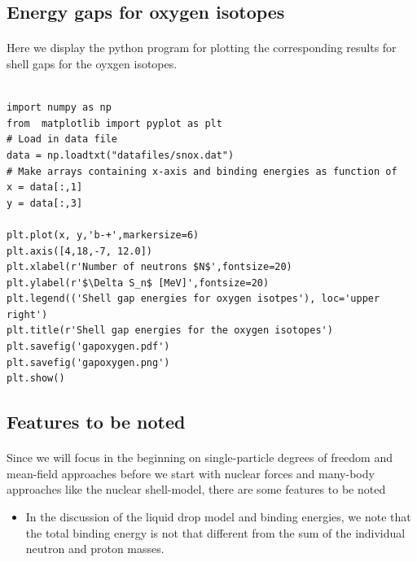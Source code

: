 \documentclass[%
twoside,                 %
final,                   %
10pt]{article}
\begin{document}
\subsection*{Energy gaps for oxygen isotopes}

\paragraph{}
Here we display the python program for plotting the corresponding results for shell gaps for the oyxgen isotopes. 
\begin{verbatim}

import numpy as np
from  matplotlib import pyplot as plt
# Load in data file
data = np.loadtxt("datafiles/snox.dat")
# Make arrays containing x-axis and binding energies as function of
x = data[:,1]
y = data[:,3]

plt.plot(x, y,'b-+',markersize=6)
plt.axis([4,18,-7, 12.0])
plt.xlabel(r'Number of neutrons $N$',fontsize=20)
plt.ylabel(r'$\Delta S_n$ [MeV]',fontsize=20)
plt.legend(('Shell gap energies for oxygen isotpes'), loc='upper right')
plt.title(r'Shell gap energies for the oxygen isotopes')
plt.savefig('gapoxygen.pdf')
plt.savefig('gapoxygen.png')
plt.show()
\end{verbatim}






\subsection*{Features to be noted}

\paragraph{}
Since we will focus in the beginning on single-particle degrees of freedom and mean-field approaches before we
start with nuclear forces and many-body approaches like the nuclear shell-model, there are some features to be noted

\begin{itemize}
\item In the discussion of the liquid drop model and binding energies, we note that the total binding energy is not that different from the sum of the individual neutron and proton masses. 
\end{itemize}
\end{document}
